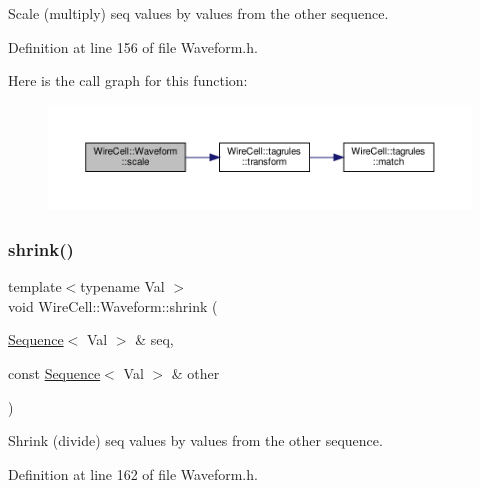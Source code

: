 Scale (multiply) seq values by values from the other sequence. 



Definition at line 156 of file Waveform.\+h.

Here is the call graph for this function\+:
\nopagebreak
\begin{figure}[H]
\begin{center}
\leavevmode
\includegraphics[width=350pt]{namespace_wire_cell_1_1_waveform_a6eea0e61cd0999be1219fd0d504e3b13_cgraph}
\end{center}
\end{figure}
\mbox{\label{namespace_wire_cell_1_1_waveform_adad443bd3c3ee1a0c2e65c9a39282a53}} 
\subsubsection{\texorpdfstring{shrink()}{shrink()}}
{\footnotesize\ttfamily template$<$typename Val $>$ \\
void Wire\+Cell\+::\+Waveform\+::shrink (\begin{DoxyParamCaption}\item[{\hyperlink{namespace_wire_cell_1_1_waveform_a1d2a1b672e3b220dcd64a994531de95d}{Sequence}$<$ Val $>$ \&}]{seq,  }\item[{const \hyperlink{namespace_wire_cell_1_1_waveform_a1d2a1b672e3b220dcd64a994531de95d}{Sequence}$<$ Val $>$ \&}]{other }\end{DoxyParamCaption})}



Shrink (divide) seq values by values from the other sequence. 



Definition at line 162 of file Waveform.\+h.

